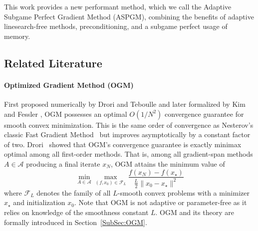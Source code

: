 \documentclass[11pt]{article}
\numberwithin{equation}{section}
\theoremstyle{definition}
\theoremstyle{plain}
\theoremstyle{definition}
\begin{document}
This work provides a new performant method, which we call the Adaptive Subgame Perfect Gradient Method (ASPGM), combining the benefits of adaptive linesearch-free methods, preconditioning, and a subgame perfect usage of memory.

\subsection{Related Literature}

\paragraph{Optimized Gradient Method (OGM)}
First proposed numerically by Drori and Teboulle \cite{FirstPEP} and later formalized by Kim and Fessler \cite{OGM}, OGM possesses an optimal $O(1/N^2)$ convergence guarantee for smooth convex minimization. This is the same order of convergence as Nesterov's classic Fast Gradient Method~\cite{Nesterov} but improves asymptotically by a constant factor of two. Drori~\cite{Drori_OGMOptimal} showed that OGM's convergence guarantee is exactly minimax optimal among all first-order methods. That is, among all gradient-span methods $A\in\mathcal{A}$ producing a final iterate $x_N$, OGM attains the minimum value of
\begin{equation}\label{eq:minimax-optimality}
    \min_{A\in \mathcal{A}} \max_{(f,x_0)\in\mathcal{F}_L} \frac{f(x_N)-f(x_\star)}{\frac{L}{2}\|x_0-x_\star\|^2}
\end{equation}
where $\mathcal{F}_L$ denotes the family of all $L$-smooth convex problems with a minimizer $x_\star$ and initialization $x_0$. Note that OGM is not adaptive or parameter-free as it relies on knowledge of the smoothness constant $L$. OGM and its theory are formally introduced in Section~\ref{SubSec:OGM}.
\end{document}
